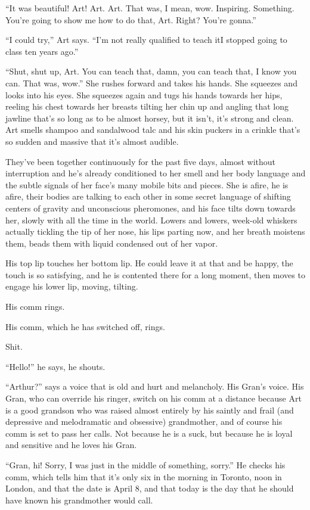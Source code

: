 “It was beautiful! Art! Art. Art. That was, I mean, wow. Inspiring.
Something. You’re going to show me how to do that, Art. Right?
You’re gonna.”

“I could try,” Art says. “I’m not really qualified to teach it{\dash}I
stopped going to class ten years ago.”

“Shut, shut up, Art. You can teach that, damn, you can teach that,
I know you can. That was, wow.” She rushes forward and takes his
hands. She squeezes and looks into his eyes. She squeezes again and
tugs his hands towards her hips, reeling his chest towards her
breasts tilting her chin up and angling that long jawline that’s so
long as to be almost horsey, but it isn’t, it’s strong and clean.
Art smells shampoo and sandalwood talc and his skin puckers in a
crinkle that’s so sudden and massive that it’s almost audible.

They’ve been together continuously for the past five days, almost
without interruption and he’s already conditioned to her smell and
her body language and the subtle signals of her face’s many mobile
bits and pieces. She is afire, he is afire, their bodies are
talking to each other in some secret language of shifting centers
of gravity and unconscious pheromones, and his face tilts down
towards her, slowly with all the time in the world. Lowers and
lowers, week-old whiskers actually tickling the tip of her nose,
his lips parting now, and her breath moistens them, beads them with
liquid condensed out of her vapor.

His top lip touches her bottom lip. He could leave it at that and
be happy, the touch is so satisfying, and he is contented there for
a long moment, then moves to engage his lower lip, moving,
tilting.

His comm rings.

His comm, which he has switched off, rings.

Shit.

“Hello!” he says, he shouts.

“Arthur?” says a voice that is old and hurt and melancholy. His
Gran’s voice. His Gran, who can override his ringer, switch on his
comm at a distance because Art is a good grandson who was raised
almost entirely by his saintly and frail (and depressive and
melodramatic and obsessive) grandmother, and of course his comm is
set to pass her calls. Not because he is a suck, but because he is
loyal and sensitive and he loves his Gran.

“Gran, hi! Sorry, I was just in the middle of something, sorry.” He
checks his comm, which tells him that it’s only six in the morning
in Toronto, noon in London, and that the date is April 8, and that
today is the day that he should have known his grandmother would
call.

